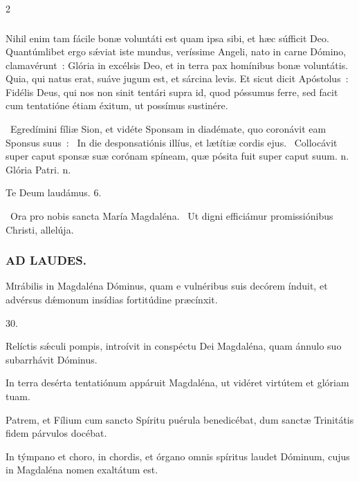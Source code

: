\documentclass[9pt,twoside]{extarticle}
\begin{document}
\begin{multicols}{2}
{\subsubsection*{\center {}}
Nihil enim tam fácile bonæ voluntáti est quam ipsa sibi, et hæc súfficit Deo. Quantúmlibet ergo sǽviat iste mundus, veríssime Angeli, nato in carne Dómino, clamavérunt~: Glória in excélsis Deo, et in terra pax homínibus bonæ voluntátis. Quia, qui natus erat, suáve jugum est, et sárcina levis. Et sicut dicit Apóstolus~: Fidélis Deus, qui nos non sinit tentári supra id, quod póssumus ferre, sed facit cum tentatióne étiam éxitum, ut possímus sustinére.

\begin{tightlist}{}
\item {}~Egredímini fíliæ Sion, et vidéte Sponsam in diadémate, quo coronávit eam Sponsus suus~: \textred{*}~In die desponsatiónis illíus, et lætítiæ cordis ejus. ~Collocávit super caput sponsæ suæ corónam spíneam, quæ pósita fuit super caput suum. n. Glória Patri. n.
\item Te Deum laudámus. 6.
\item {}~Ora pro nobis sancta María Magdaléna. ~Ut digni efficiámur promissiónibus Christi, allelúja.
\end{tightlist}

\subsubsection*{\center \textsc{AD LAUDES.}}
\begin{center}\end{center}
\lettrine{M}irábilis in Magdaléna Dóminus, quam e vulnéribus suis decórem índuit, et advérsus dǽmonum insídias fortitúdine præcínxit.

\begin{tightlist}{}
\item {} 30.
\item {} Relíctis sǽculi pompis, introívit in conspéctu Dei Magdaléna, quam ánnulo suo subarrhávit Dóminus.
\item {} In terra desérta tentatiónum appáruit Magdaléna, ut vidéret virtútem et glóriam tuam.
\item {} Patrem, et Fílium cum sancto Spíritu puérula benedicébat, dum sanctæ Trinitátis fidem párvulos docébat.
\item {} In týmpano et choro, in chordis, et órgano omnis spíritus laudet Dóminum, cujus in Magdaléna nomen exaltátum est.
\end{tightlist}

}
\end{multicols}
\end{document}
